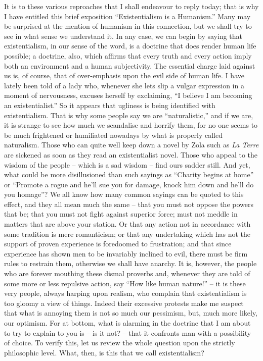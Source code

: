 \documentclass[12pt]{article}
\begin{document}
It is to these various reproaches that I shall endeavour to reply today; that is why I have entitled this brief exposition “Existentialism is a Humanism.” Many may be surprised at the mention of humanism in this connection, but we shall try to see in what sense we understand it. In any case, we can begin by saying that existentialism, in our sense of the word, is a doctrine that does render human life possible; a doctrine, also, which affirms that every truth and every action imply both an environment and a human subjectivity. The essential charge laid against us is, of course, that of over-emphasis upon the evil side of human life. I have lately been told of a lady who, whenever she lets slip a vulgar expression in a moment of nervousness, excuses herself by exclaiming, “I believe I am becoming an existentialist.” So it appears that ugliness is being identified with existentialism. That is why some people say we are “naturalistic,” and if we are, it is strange to see how much we scandalise and horrify them, for no one seems to be much frightened or humiliated nowadays by what is properly called naturalism. Those who can quite well keep down a novel by Zola such as \textit{La Terre} are sickened as soon as they read an existentialist novel. Those who appeal to the wisdom of the people – which is a sad wisdom – find ours sadder still. And yet, what could be more disillusioned than such sayings as “Charity begins at home” or “Promote a rogue and he’ll sue you for damage, knock him down and he’ll do you homage”? We all know how many common sayings can be quoted to this effect, and they all mean much the same – that you must not oppose the powers that be; that you must not fight against superior force; must not meddle in matters that are above your station. Or that any action not in accordance with some tradition is mere romanticism; or that any undertaking which has not the support of proven experience is foredoomed to frustration; and that since experience has shown men to be invariably inclined to evil, there must be firm rules to restrain them, otherwise we shall have anarchy. It is, however, the people who are forever mouthing these dismal proverbs and, whenever they are told of some more or less repulsive action, say “How like human nature!” – it is these very people, always harping upon realism, who complain that existentialism is too gloomy a view of things. Indeed their excessive protests make me suspect that what is annoying them is not so much our pessimism, but, much more likely, our optimism. For at bottom, what is alarming in the doctrine that I am about to try to explain to you is – is it not? – that it confronts man with a possibility of choice. To verify this, let us review the whole question upon the strictly philosophic level. What, then, is this that we call existentialism?
\end{document}
